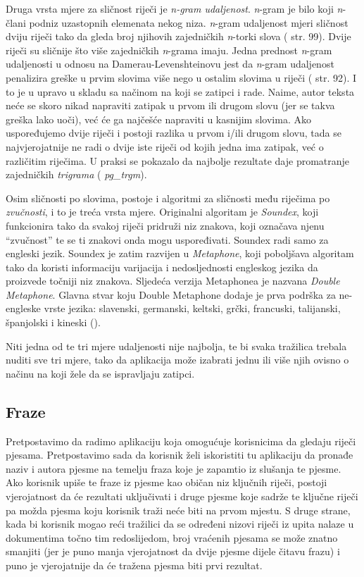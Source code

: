\documentclass[a4paper,twoside,12pt]{scrreprt}
\begin{document}
Druga vrsta mjere za sličnost riječi je \textit{n-gram udaljenost}. \textit{n}-gram je bilo koji \textit{n}-člani podniz uzastopnih elemenata nekog niza. \textit{n}-gram udaljenost mjeri sličnost dviju riječi tako da gleda broj njihovih zajedničkih \textit{n}-torki slova (\cite{taming} str. 99). Dvije riječi su sličnije što više zajedničkih \textit{n}-grama imaju. Jedna prednost \textit{n}-gram udaljenosti u odnosu na Damerau-Levenshteinovu jest da \textit{n}-gram udaljenost penalizira greške u prvim slovima više nego u ostalim slovima u riječi (\cite{taming} str. 92). I to je u upravo u skladu sa načinom na koji se zatipci i rade. Naime, autor teksta neće se skoro nikad napraviti zatipak u prvom ili drugom slovu (jer se takva greška lako uoči), već će ga najčešće napraviti u kasnijim slovima. Ako uspoređujemo dvije riječi i postoji razlika u prvom i/ili drugom slovu, tada se najvjerojatnije ne radi o dvije iste riječi od kojih jedna ima zatipak, već o različitim riječima. U praksi se pokazalo da najbolje rezultate daje promatranje zajedničkih \textit{trigrama} (\cite{postgres} \textit{pg\_trgm}).

Osim sličnosti po slovima, postoje i algoritmi za sličnosti među riječima po \textit{zvučnosti}, i to je treća vrsta mjere. Originalni algoritam je \textit{Soundex}, koji funkcionira tako da svakoj riječi pridruži niz znakova, koji označava njenu ``zvučnost'' te se ti znakovi onda mogu uspoređivati. Soundex radi samo za engleski jezik. Soundex je zatim razvijen u \textit{Metaphone}, koji poboljšava algoritam tako da koristi informaciju varijacija i nedosljednosti engleskog jezika da proizvede točniji niz znakova. Sljedeća verzija Metaphonea je nazvana \textit{Double Metaphone}. Glavna stvar koju Double Metaphone dodaje je prva podrška za ne-engleske vrste jezika: slavenski, germanski, keltski, grčki, francuski, talijanski, španjolski i kineski (\cite{metaphone}).

Niti jedna od te tri mjere udaljenosti nije najbolja, te bi svaka tražilica trebala nuditi sve tri mjere, tako da aplikacija može izabrati jednu ili više njih ovisno o načinu na koji žele da se ispravljaju zatipci.

\subsection{Fraze}

Pretpostavimo da radimo aplikaciju koja omogućuje korisnicima da gledaju riječi pjesama. Pretpostavimo sada da korisnik želi iskoristiti tu aplikaciju da pronađe naziv i autora pjesme na temelju fraza koje je zapamtio iz slušanja te pjesme. Ako korisnik upiše te fraze iz pjesme kao običan niz ključnih riječi, postoji vjerojatnost da će rezultati uključivati i druge pjesme koje sadrže te ključne riječi pa možda pjesma koju korisnik traži neće biti na prvom mjestu. S druge strane, kada bi korisnik mogao reći tražilici da se određeni nizovi riječi iz upita nalaze u dokumentima točno tim redoslijedom, broj vraćenih pjesama se može znatno smanjiti (jer je puno manja vjerojatnost da dvije pjesme dijele čitavu frazu) i puno je vjerojatnije da će tražena pjesma biti prvi rezultat.
\end{document}
